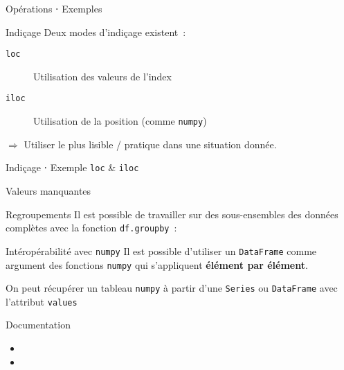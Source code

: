 \begin{frame}{Opérations ⋅ Exemples}
\end{frame}

\begin{frame}{Indiçage}
  Deux modes d'indiçage existent~:
  \begin{description}
    \item[\texttt{loc}] Utilisation des valeurs de l'index
    \item[\texttt{iloc}] Utilisation de la position (comme \texttt{numpy})
  \end{description}
  $\Rightarrow$ Utiliser le plus lisible / pratique dans une situation donnée.
\end{frame}

\begin{frame}{Indiçage ⋅ Exemple \texttt{loc} \& \texttt{iloc}}
\end{frame}

\begin{frame}{Valeurs manquantes}
\end{frame}

\begin{frame}{Regroupements}
  Il est possible de travailler sur des sous-ensembles des données complètes avec la fonction \texttt{df.groupby}~:
\end{frame}

\begin{frame}{Intéropérabilité avec \texttt{numpy}}
  Il est possible d'utiliser un \texttt{DataFrame} comme argument des fonctions \texttt{numpy} qui s'appliquent \textbf{élément par élément}.

  On peut récupérer un tableau \texttt{numpy} à partir d'une \texttt{Series} ou \texttt{DataFrame} avec l'attribut \texttt{values}

\end{frame}

\begin{frame}{Documentation}
  \begin{itemize}
    \item {}
    \item {}
  \end{itemize}
\end{frame}
